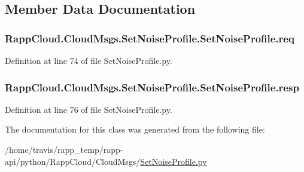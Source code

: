 \subsection{Member Data Documentation}
\hypertarget{classRappCloud_1_1CloudMsgs_1_1SetNoiseProfile_1_1SetNoiseProfile_aed9faf7230b06d3ed1e705ab66202195}{
\subsubsection[{req}]{\setlength{\rightskip}{0pt plus 5cm}Rapp\-Cloud.\-Cloud\-Msgs.\-Set\-Noise\-Profile.\-Set\-Noise\-Profile.\-req}}\label{classRappCloud_1_1CloudMsgs_1_1SetNoiseProfile_1_1SetNoiseProfile_aed9faf7230b06d3ed1e705ab66202195}


Definition at line 74 of file Set\-Noise\-Profile.\-py.

\hypertarget{classRappCloud_1_1CloudMsgs_1_1SetNoiseProfile_1_1SetNoiseProfile_a8b6882752baa8ce97e0a11cd534405f2}{
\subsubsection[{resp}]{\setlength{\rightskip}{0pt plus 5cm}Rapp\-Cloud.\-Cloud\-Msgs.\-Set\-Noise\-Profile.\-Set\-Noise\-Profile.\-resp}}\label{classRappCloud_1_1CloudMsgs_1_1SetNoiseProfile_1_1SetNoiseProfile_a8b6882752baa8ce97e0a11cd534405f2}


Definition at line 76 of file Set\-Noise\-Profile.\-py.



The documentation for this class was generated from the following file\-:\begin{DoxyCompactItemize}
\item 
/home/travis/rapp\-\_\-temp/rapp-\/api/python/\-Rapp\-Cloud/\-Cloud\-Msgs/\hyperlink{SetNoiseProfile_8py}{Set\-Noise\-Profile.\-py}\end{DoxyCompactItemize}
